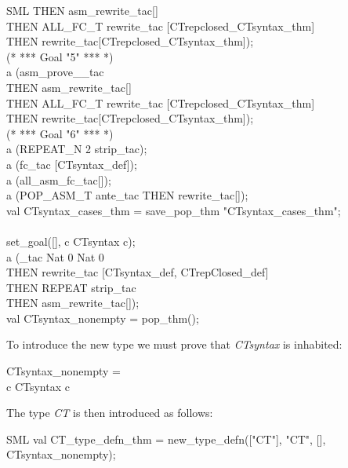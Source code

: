 {\begin{GFT}{SML}
\+	THEN asm\_rewrite\_tac[]\\
\+	THEN ALL\_FC\_T rewrite\_tac [CTrepclosed\_CTsyntax\_thm]\\
\+	THEN rewrite\_tac[CTrepclosed\_CTsyntax\_thm]);\\
\+(* *** Goal "5" *** *)\\
\+a (asm\_prove\_\MMM{\exists}\_tac\\
\+	THEN asm\_rewrite\_tac[]\\
\+	THEN ALL\_FC\_T rewrite\_tac [CTrepclosed\_CTsyntax\_thm]\\
\+	THEN rewrite\_tac[CTrepclosed\_CTsyntax\_thm]);\\
\+(* *** Goal "6" *** *)\\
\+a (REPEAT\_N 2 strip\_tac);\\
\+a (fc\_tac [CTsyntax\_def]);\\
\+a (all\_asm\_fc\_tac[]);\\
\+a (POP\_ASM\_T ante\_tac THEN rewrite\_tac[]);\\
\+val CTsyntax\_cases\_thm = save\_pop\_thm "CTsyntax\_cases\_thm";\\
\+\\
\+set\_goal([], \PrKM{}\MMM{\exists}c\MMM{\bullet} CTsyntax c\PrKO{});\\
\+a (\MMM{\exists}\_tac \PrKM{}Nat 0 \MMM{\mapsto} Nat 0\PrKO{}\\
\+	THEN rewrite\_tac [CTsyntax\_def, CTrepClosed\_def]\\
\+	THEN REPEAT strip\_tac\\
\+	THEN asm\_rewrite\_tac[]);\\
\+val CTsyntax\_nonempty = pop\_thm();\\
\end{GFT}
}%

To introduce the new type we must prove that \emph{CTsyntax} is inhabited: 

\begin{GFT}{}
\+\PrNL{}CTsyntax\_nonempty\PrNN{} = \\
\+	\MMM{\Zthm} \MMM{\exists}c\MMM{\bullet} CTsyntax c\\
\end{GFT}

The type \emph{CT} is then introduced as follows:

\begin{GFT}{SML}
\+val CT\_type\_defn\_thm = new\_type\_defn(["CT"], "CT", [], CTsyntax\_nonempty);\\
\end{GFT}


